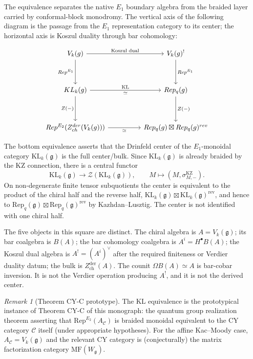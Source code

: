 \documentclass[11pt]{article}
\theoremstyle{definition}
\theoremstyle{remark}
\newtheorem{remark}[theorem]{Remark}
\newcommand{\Rep}{\mathrm{Rep}}
\newcommand{\MF}{\mathrm{MF}}
\newcommand{\cC}{\mathcal{C}}
\newcommand{\cZ}{\mathcal{Z}}
\newcommand{\frakg}{\mathfrak{g}}
\newcommand{\KL}{\mathrm{KL}}
\newcommand{\KZ}{\mathrm{KZ}}
\begin{document}
The equivalence separates the native $E_1$ boundary algebra from the
braided layer carried by conformal-block monodromy. The vertical axis of
the following diagram is the passage from the $E_1$ representation
category to its center; the horizontal axis is Koszul duality through
bar cohomology:

\begin{equation}\label{eq:master-square}
\begin{tikzcd}[column sep=huge, row sep=huge]
 V_k(\frakg) \arrow[r, "\text{Koszul dual}"] \arrow[d, "\Rep^{E_1}"']
 & V_k(\frakg)^! \arrow[d, "\Rep^{E_1}"] \\
 \KL_k(\frakg) \arrow[r, "\simeq"', "\text{KL}"]
 \arrow[d, "\cZ(-)"']
 & \Rep_q(\frakg) \arrow[d, "\cZ(-)"] \\
 \Rep^{E_2}(Z^{\mathrm{der}}_{\mathrm{ch}}(V_k(\frakg)))
 \arrow[r, "\simeq"']
 & \Rep_q(\frakg)\boxtimes\Rep_q(\frakg)^{\mathrm{rev}}
\end{tikzcd}
\end{equation}

The bottom equivalence asserts that the Drinfeld center of the $E_1$-monoidal
category $\KL_k(\frakg)$ is the full center/bulk. Since
$\KL_k(\frakg)$ is already braided by the KZ connection, there is a
central functor
\[
 \KL_k(\frakg) \longrightarrow \cZ(\KL_k(\frakg)),
 \qquad M\longmapsto (M,\sigma^{\KZ}_{M,-}).
\]
On non-degenerate finite tensor subquotients the center is equivalent to
the product of the chiral half and the reverse half,
$\KL_k(\frakg)\boxtimes\KL_k(\frakg)^{\mathrm{rev}}$, and hence to
$\Rep_q(\frakg)\boxtimes\Rep_q(\frakg)^{\mathrm{rev}}$ by
Kazhdan--Lusztig. The center is not identified with one chiral half.

The five objects in this square are distinct. The chiral algebra is
$A=V_k(\frakg)$; its bar coalgebra is $B(A)$; the bar cohomology
coalgebra is $A^i=H^\bullet B(A)$; the Koszul dual algebra is
$A^!=(A^i)^\vee$ after the required finiteness or Verdier duality
datum; the bulk is $Z^{\mathrm{der}}_{\mathrm{ch}}(A)$. The counit
$\Omega B(A)\simeq A$ is bar-cobar inversion. It is not the Verdier
operation producing $A^!$, and it is not the derived center.

\begin{remark}[Theorem CY-C prototype]
The KL equivalence is the prototypical instance of Theorem CY-C of this
monograph: the quantum group realization theorem asserting that
$\Rep^{E_2}(A_\cC)$ is braided monoidal equivalent to the CY category
$\cC$ itself (under appropriate hypotheses). For the affine Kac--Moody
case, $A_\cC = V_k(\frakg)$ and the relevant CY category is (conjecturally)
the matrix factorization category $\MF(W_\frakg)$.
\end{remark}
\end{document}
